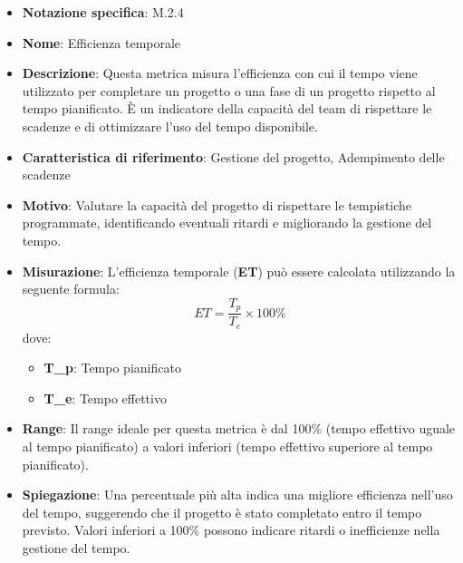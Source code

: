 \begin{itemize}
    \item \textbf{Notazione specifica}: M.2.4
    \item \textbf{Nome}: Efficienza temporale
    \item \textbf{Descrizione}: Questa metrica misura l'efficienza con cui il tempo viene utilizzato per completare un progetto o una fase di un progetto rispetto al tempo pianificato. È un indicatore della capacità del team di rispettare le scadenze e di ottimizzare l'uso del tempo disponibile.
    \item \textbf{Caratteristica di riferimento}: Gestione del progetto, Adempimento delle scadenze
    \item \textbf{Motivo}: Valutare la capacità del progetto di rispettare le tempistiche programmate, identificando eventuali ritardi e migliorando la gestione del tempo.
    \item \textbf{Misurazione}: L'efficienza temporale (\textbf{ET}) può essere calcolata utilizzando la seguente formula:
    \[ ET = \frac{T_p}{T_e} \times 100\% \]
    dove:
    \begin{itemize}
        \item \textbf{T_p}: Tempo pianificato
        \item \textbf{T_e}: Tempo effettivo
    \end{itemize}
    \item \textbf{Range}: Il range ideale per questa metrica è dal 100\% (tempo effettivo uguale al tempo pianificato) a valori inferiori (tempo effettivo superiore al tempo pianificato).
    \item \textbf{Spiegazione}: Una percentuale più alta indica una migliore efficienza nell'uso del tempo, suggerendo che il progetto è stato completato entro il tempo previsto. Valori inferiori a 100\% possono indicare ritardi o inefficienze nella gestione del tempo.
\end{itemize}
